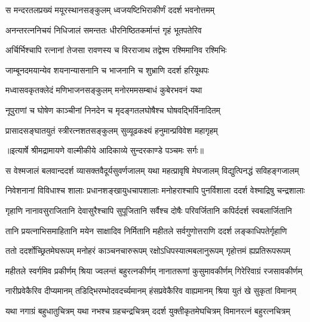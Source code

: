 \twolineshloka
{स मन्दरतलप्रख्यं मयूरस्थानसङ्कुलम्}
{ध्वजयष्टिभिराकीर्णं ददर्श भवनोत्तमम्} %

\twolineshloka
{अनन्तरत्ननिचयं निधिजालं समन्ततः}
{धीरनिष्ठितकर्मान्तं गृहं भूतपतेरिव} %

\twolineshloka
{अर्चिर्भिश्चापि रत्नानां तेजसा रावणस्य च}
{विरराजाथ तद्वेश्म रश्मिमानिव रश्मिभिः} %

\twolineshloka
{जाम्बूनदमयान्येव शयनान्यासनानि च}
{भाजनानि च शुभ्राणि ददर्श हरियूथपः} %

\twolineshloka
{मध्वासवकृतक्लेदं मणिभाजनसङ्कुलम्}
{मनोरममसम्बाधं कुबेरभवनं यथा} %

\twolineshloka
{नूपुराणां च घोषेण काञ्चीनां निनदेन च}
{मृदङ्गतलघोषैश्च घोषवद्भिर्विनादितम्} %

\twolineshloka
{प्रासादसङ्घातयुतं स्त्रीरत्नशतसङ्कुलम्}
{सुव्यूढकक्ष्यं हनुमान्प्रविवेश महागृहम्} %


{॥इत्यार्षे श्रीमद्रामायणे वाल्मीकीये आदिकाव्ये सुन्दरकाण्डे पञ्चमः सर्गः॥}


\fourlineindentedshloka
{स वेश्मजालं बलवान्ददर्श}
{व्यासक्तवैदूर्यसुवर्णजालम्}
{यथा महत्प्रावृषि मेघजालम्}
{विद्युत्पिनद्धं सविहङ्गजालम्} %

\fourlineindentedshloka
{निवेशनानां विविधाश्च शालाः}
{प्रधानशङ्खायुधचापशालाः}
{मनोहराश्चापि पुनर्विशाला}
{ददर्श वेश्माद्रिषु चन्द्रशालाः} %

\fourlineindentedshloka
{गृहाणि नानावसुराजितानि}
{देवासुरैश्चापि सुपूजितानि}
{सर्वैश्च दोषैः परिवर्जितानि}
{कपिर्ददर्श स्वबलार्जितानि} %

\fourlineindentedshloka
{तानि प्रयत्नाभिसमाहितानि}
{मयेन साक्षादिव निर्मितानि}
{महीतले सर्वगुणोत्तराणि}
{ददर्श लङ्काधिपतेर्गृहाणि} %

\fourlineindentedshloka
{ततो ददर्शोच्छ्रितमेघरूपम्}
{मनोहरं काञ्चनचारुरूपम्}
{रक्षोऽधिपस्यात्मबलानुरूपम्}
{गृहोत्तमं ह्यप्रतिरूपरूपम्} %

\fourlineindentedshloka
{महीतले स्वर्गमिव प्रकीर्णम्}
{श्रिया ज्वलन्तं बहुरत्नकीर्णम्}
{नानातरूणां कुसुमावकीर्णम्}
{गिरेरिवाग्रं रजसावकीर्णम्} %

\fourlineindentedshloka
{नारीप्रवेकैरिव दीप्यमानम्}
{तडिद्भिरम्भोदवदर्च्यमानम्}
{हंसप्रवेकैरिव वाह्यमानम्}
{श्रिया युतं खे सुकृतां विमानम्} %

\fourlineindentedshloka
{यथा नगाग्रं बहुधातुचित्रम्}
{यथा नभश्च ग्रहचन्द्रचित्रम्}
{ददर्श युक्तीकृतमेघचित्रम्}
{विमानरत्नं बहुरत्नचित्रम्} %


